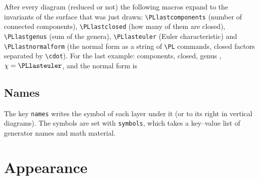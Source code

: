 \documentclass[11pt]{article}
\newenvironment{result}{\par\smallskip\noindent\hspace*{1em}}{\par\medskip}
\newcommand\opt[1]{\texttt{#1}}
\newcommand\cs[1]{\texttt{\textbackslash#1}}
\begin{document}
After every diagram (reduced or not) the following macros expand to the
invariants of the surface that was just drawn: \cs{PLlastcomponents} (number
of connected components), \cs{PLlastclosed} (how many of them are closed),
\cs{PLlastgenus} (sum of the genera), \cs{PLlasteuler} (Euler
characteristic) and \cs{PLlastnormalform} (the normal form as a string of
\cs{PL} commands, closed factors separated by \verb|\cdot|). For the last
example: \PLlastcomponents{} components, \PLlastclosed{} closed, genus
\PLlastgenus, $\chi = \PLlasteuler$, and the normal form is
\begin{center}\ttfamily\small\PLlastnormalform\end{center}

\subsection{Names}

The key \opt{names} writes the symbol of each layer under it (or to its
right in vertical diagrams). The symbols are set with \opt{symbols}, which
takes a key--value list of generator names and math material.

\begin{code}
\end{code}
\begin{result}
  \qquad
\end{result}

\section{Appearance}
\end{document}
